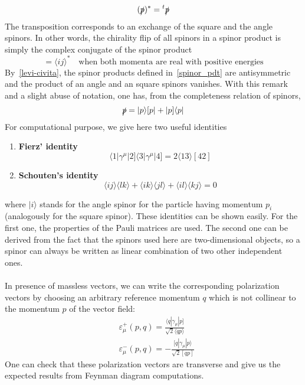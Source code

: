 \begin{equation}
(\slashed{p})^* = {}^t\slashed{p}
\end{equation}
The transposition corresponds to an exchange of the square and the angle spinors. 
In other words, the chirality flip of all spinors in a spinor product is simply the complex conjugate of the spinor product
\begin{equation}
[ij] = \langle ij \rangle^* \quad\textrm{when both momenta are real with positive energies}
\end{equation}
By~\cref{levi-civita}, the spinor products defined in~\cref{spinor_pdt} are antisymmetric and the product of an angle and an square spinors vanishes. 
With this remark and a slight abuse of notation, one has, from the completeness relation of spinors,
\begin{equation}\label{p_splinors}
\slashed{p} = |p\rangle [p| + |p]\langle p|
\end{equation}
For computational purpose, we give here two useful identities
\begin{enumerate}
\item \textbf{Fierz' identity} 
\begin{equation}\label{fierz_id}
\langle 1 |\gamma^\mu |2]\langle 3 |\gamma^\mu|4] = 2\langle 13 \rangle [42]
\end{equation}
\item \textbf{Schouten's identity} 
\begin{equation}
\langle ij \rangle \langle lk \rangle + \langle ik\rangle \langle jl\rangle + \langle il \rangle \langle kj \rangle = 0
\end{equation}
\end{enumerate}
where $|i\rangle$ stands for the angle spinor for the particle having momentum $p_i$ (analogously for the square spinor). 
These identities can be shown easily.
For the first one, the properties of the Pauli matrices are used.
The second one can be derived from the fact that the spinors used here are two-dimensional objects, so a spinor can always be written as linear combination of two other independent ones.
%
\\\\
In presence of massless vectors, we can write the corresponding polarization vectors by choosing an arbitrary reference momentum $q$ which is not collinear to the momentum $p$ of the vector field:
\begin{equation}\label{pol_vec}
\begin{split}
& \varepsilon^+_\mu (p, q) = \frac{\langle q | \gamma_\mu |p]}{\sqrt{2}\langle qp \rangle}
\\
& \varepsilon^-_\mu (p, q) = -\frac{[q|\gamma_\mu | p\rangle}{\sqrt{2}[qp]}
\end{split}
\end{equation}
One can check that these polarization vectors are transverse and give us the expected results from Feynman diagram computations. 
%
%
